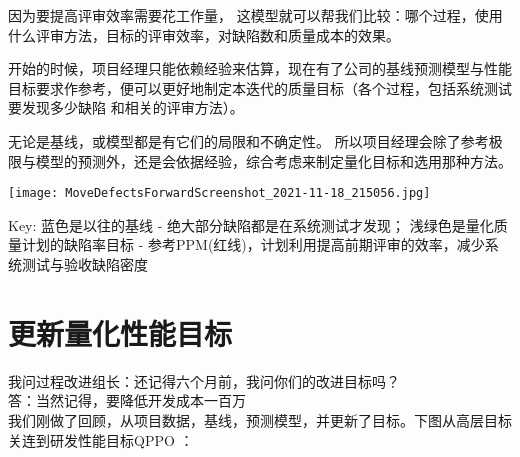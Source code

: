 因为要提高评审效率需要花工作量，
这模型就可以帮我们比较：哪个过程，使用什么评审方法，目标的评审效率，对缺陷数和质量成本的效果。

开始的时候，项目经理只能依赖经验来估算，现在有了公司的基线预测模型与性能目标要求作参考，便可以更好地制定本迭代的质量目标（各个过程，包括系统测试要发现多少缺陷
和相关的评审方法）。

无论是基线，或模型都是有它们的局限和不确定性。
所以项目经理会除了参考极限与模型的预测外，还是会依据经验，综合考虑来制定量化目标和选用那种方法。


\texttt{[image: MoveDefectsForwardScreenshot\_2021-11-18\_215056.jpg]}

Key: 蓝色是以往的基线 - 绝大部分缺陷都是在系统测试才发现；
浅绿色是量化质量计划的缺陷率目标 -
参考PPM(红线)，计划利用提高前期评审的效率，减少系统测试与验收缺陷密度\\


\hypertarget{ux66f4ux65b0ux91cfux5316ux6027ux80fdux76eeux6807}{%
\section{更新量化性能目标}\label{ux66f4ux65b0ux91cfux5316ux6027ux80fdux76eeux6807}}

我问过程改进组长：还记得六个月前，我问你们的改进目标吗？\\
答：当然记得，要降低开发成本一百万\\
我们刚做了回顾，从项目数据，基线，预测模型，并更新了目标。下图从高层目标关连到研发性能目标QPPO
：\\


